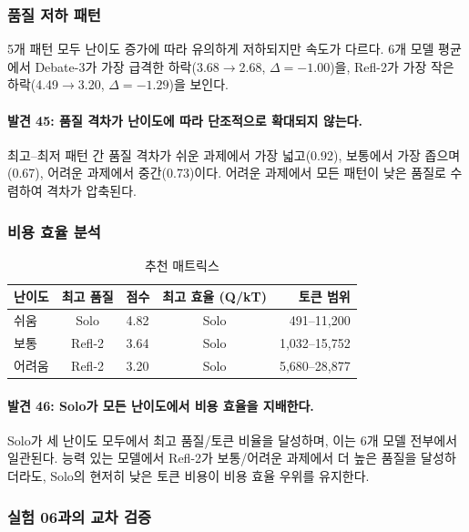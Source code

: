 \documentclass[a4paper,11pt]{article}
\begin{document}
\subsubsection{품질 저하 패턴}

5개 패턴 모두 난이도 증가에 따라 유의하게 저하되지만 속도가 다르다. 6개 모델 평균에서 Debate-3가 가장 급격한 하락(3.68$\to$2.68, $\Delta=-1.00$)을, Refl-2가 가장 작은 하락(4.49$\to$3.20, $\Delta=-1.29$)을 보인다.

\paragraph{발견 45: 품질 격차가 난이도에 따라 단조적으로 확대되지 않는다.}
최고--최저 패턴 간 품질 격차가 쉬운 과제에서 가장 넓고(0.92), 보통에서 가장 좁으며(0.67), 어려운 과제에서 중간(0.73)이다. 어려운 과제에서 모든 패턴이 낮은 품질로 수렴하여 격차가 압축된다.

\subsubsection{비용 효율 분석}

\begin{table}[H]
\centering
\caption{추천 매트릭스}
\label{tab:recommendation-matrix}
{\small
\begin{tabular}{lclcr}
\toprule
난이도 & 최고 품질 & 점수 & 최고 효율 (Q/kT) & 토큰 범위 \\
\midrule
쉬움   & Solo   & 4.82 & Solo & 491--11,200 \\
보통   & Refl-2 & 3.64 & Solo & 1,032--15,752 \\
어려움 & Refl-2 & 3.20 & Solo & 5,680--28,877 \\
\bottomrule
\end{tabular}
}
\end{table}

\paragraph{발견 46: Solo가 모든 난이도에서 비용 효율을 지배한다.}
Solo가 세 난이도 모두에서 최고 품질/토큰 비율을 달성하며, 이는 6개 모델 전부에서 일관된다. 능력 있는 모델에서 Refl-2가 보통/어려운 과제에서 더 높은 품질을 달성하더라도, Solo의 현저히 낮은 토큰 비용이 비용 효율 우위를 유지한다.

\subsubsection{실험 06과의 교차 검증}
\end{document}
